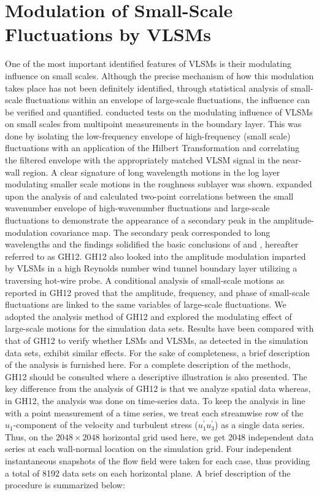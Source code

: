\section{Modulation of Small-Scale Fluctuations by VLSMs}
\label{Modulation_VLSMs}

One of the most important identified features of VLSMs is their modulating influence on small scales. Although the precise mechanism of how this modulation takes place has not been definitely identified, through statistical analysis of small-scale fluctuations within an envelope of large-scale fluctuations, the influence can be verified and quantified. \citet{MATHIS2009} conducted tests on the modulating influence of VLSMs on small scales from multipoint measurements in the boundary layer. This was done by isolating the low-frequency envelope of high-frequency (small scale) fluctuations with an application of the Hilbert Transformation and correlating the filtered envelope with the appropriately matched VLSM signal in the near-wall region. A clear signature of long wavelength motions in the log layer modulating smaller scale motions in the roughness sublayer was shown. \citet{Bernardini2011} expanded upon the analysis of \citet{MATHIS2009} and calculated two-point correlations between the small wavenumber envelope of high-wavenumber fluctuations and large-scale fluctuations to demonstrate the appearance of a secondary peak in the amplitude-modulation covariance map. The secondary peak corresponded to long wavelengths and the findings solidified the basic conclusions of \citet{MATHIS2009} and \citet{ganapathi_jfm_2012_modulation}, hereafter referred to as GH12.  GH12 also looked into the amplitude modulation imparted by VLSMs in a high Reynolds number wind tunnel boundary layer utilizing a traversing hot-wire probe. A conditional analysis of small-scale motions as reported in GH12 proved that the amplitude, frequency, and phase of small-scale fluctuations are linked to the same variables of large-scale fluctuations. We adopted the analysis method of GH12 and explored the modulating effect of large-scale motions for the simulation data sets.  Results have been compared with that of GH12 to verify whether LSMs and VLSMs, as detected in the simulation data sets, exhibit similar effects.  For the sake of completeness, a brief description of the analysis is furnished here. For a complete description of the methods, GH12 should be consulted where a descriptive illustration is also presented. The key difference from the analysis of GH12 is that we analyze spatial data whereas, in GH12, the analysis was done on time-series data. To keep the analysis in line with a point measurement of a time series, we treat each streamwise row of the $u_{1}$-component of the velocity and turbulent stress ($u_{1}^{\prime} u_{3}^{\prime}$) as a single data series. Thus, on the $2048 \times 2048$ horizontal grid used here, we get 2048 independent data series at each wall-normal location on the simulation grid.  Four independent instantaneous snapshots of the flow field were taken for each case, thus providing a total of 8192 data sets on each horizontal plane. A brief description of the procedure is summarized below:
